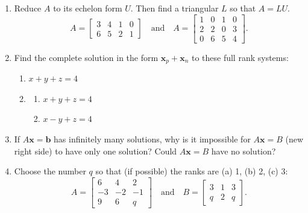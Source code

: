 \documentclass[14pt, a4paper]{article}
\begin{document}
\begin{enumerate}[resume]
    \item Reduce $A$ to its echelon form $U$. Then find a triangular $L$ so that $A = LU$.
          \[
              A = \begin{bmatrix}
                  3 & 4 & 1 & 0 \\
                  6 & 5 & 2 & 1
              \end{bmatrix}
              \quad \text{and} \quad
              A = \begin{bmatrix}
                  1 & 0 & 1 & 0 \\
                  2 & 2 & 0 & 3 \\
                  0 & 6 & 5 & 4
              \end{bmatrix}.
          \]
    \item Find the complete solution in the form $\mathbf{x}_p + \mathbf{x}_n$ to these full rank systems:
          \begin{enumerate}
              \item $x + y + z = 4$
              \item
                    \begin{enumerate}
                        \item[] $x + y + z = 4$
                        \item[] $x - y + z = 4$
                    \end{enumerate}
          \end{enumerate}

    \item If $A\mathbf{x} = \mathbf{b}$ has infinitely many solutions, why is it impossible for $A\mathbf{x} = B$ (new right side) to have only one solution? Could $A\mathbf{x} = B$ have no solution?

    \item Choose the number $q$ so that (if possible) the ranks are (a) 1, (b) 2, (c) 3:
          \[
              A = \begin{bmatrix}
                  6  & 4  & 2  \\
                  -3 & -2 & -1 \\
                  9  & 6  & q
              \end{bmatrix}
              \quad \text{and} \quad
              B = \begin{bmatrix}
                  3 & 1 & 3 \\
                  q & 2 & q
              \end{bmatrix}.
          \]


\end{enumerate}
\end{document}
